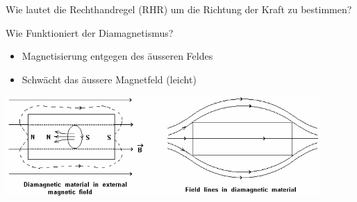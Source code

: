 \begin{karte}{Wie lautet die Rechthandregel (RHR) um die Richtung der Kraft zu bestimmen?}
\begin{karte}{Wie Funktioniert der Diamagnetismus?}
	\begin{itemize}
		\item Magnetisierung entgegen des äusseren Feldes
		\item Schwächt das äussere Magnetfeld (leicht)
	\end{itemize}
	\includegraphics[width=0.9\textwidth]{pics/MS_Diamagnetismus.png} %
\end{karte}


\end{karte}
